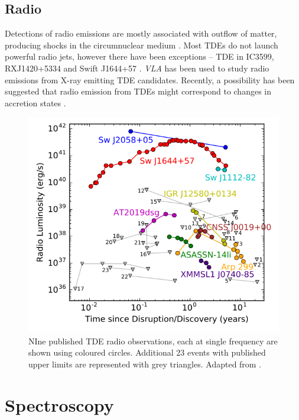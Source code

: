 \documentclass{tda}
\begin{document}
\subsection{Radio} \label{multiwave:radio}

Detections of radio emissions are mostly associated with outflow of matter, producing shocks in the circumnuclear medium \cite{bonnerot_first_2021}. Most TDEs do not launch powerful radio jets, however there have been exceptions -- TDE in IC3599, RXJ1420+5334 and Swift J1644+57 \cite{komossa_tidal_2015}. \textit{VLA} has been used to study radio emissions from X-ray emitting TDE candidates. Recently, a possibility has been suggested that radio emission from TDEs might correspond to changes in accretion states \cite{horesh_delayed_2021}.

\begin{figure} [h]
	\centering
	\captionsetup{width=.85\linewidth}
	\includegraphics[width=.4\linewidth]{./images/alexander2020.png}
	\caption{NIne published TDE radio observations, each at single frequency are shown using coloured circles. Additional 23 events \cite{alexander_radio_2020} with published upper limits are represented with grey triangles. Adapted from \cite{alexander_radio_2020}.}
\end{figure}

\newpage
\section{Spectroscopy} \label{spectroscopy}
\end{document}
